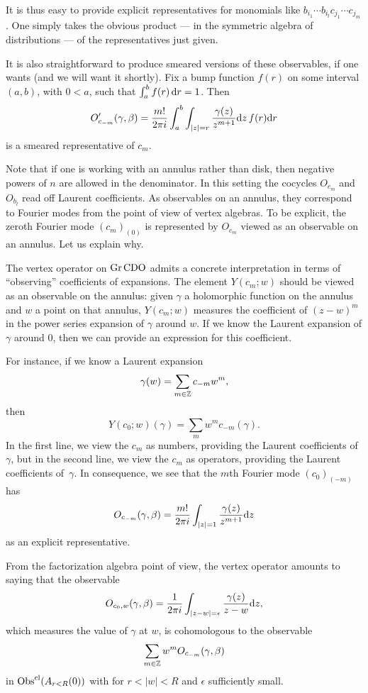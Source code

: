 It is thus easy to provide explicit representatives for monomials like $b_{i_1} \cdots b_{i_l} c_{j_1} \cdots c_{j_m}$.
One simply takes the obvious product --- in the symmetric algebra of distributions --- of the representatives just given.

It is also straightforward to produce smeared versions of these observables, if one wants 
(and we will want it shortly).
Fix a bump function $f(r)$ on some interval $(a,b)$, with $0 < a$, 
such that $\int_a^b f(r) \, {\rm d} r = 1$.
Then
\[
O'_{c_{-m}}(\gamma,\beta) = \frac{m!}{2 \pi i}\int_a^b \int_{|z| = r} \frac{\gamma(z)}{z^{m+1}} {\rm d} z \, f(r) {\rm d} r
\]
is a smeared representative of $c_m$.

Note that if one is working with an annulus rather than disk, then negative powers of $n$ are allowed in the denominator.
In this setting the cocycles $O_{c_m}$ and $O_{b_l}$ read off Laurent coefficients.
As observables on an annulus, they correspond to Fourier modes from the point of view of vertex algebras.
To be explicit, the zeroth Fourier mode $(c_m)_{(0)}$ is represented by $O_{c_m}$ viewed as an observable on an annulus.
Let us explain why.

The vertex operator on ${\rm Gr}\,{\rm CDO}$ admits a concrete interpretation in terms of ``observing'' coefficients of expansions.
The element $Y(c_m;w)$ should be viewed as an observable on the annulus:
given $\gamma$ a holomorphic function on the annulus and $w$ a point on that annulus, 
$Y(c_m;w)$ measures the coefficient of $(z-w)^m$ in the power series expansion of $\gamma$ around $w$.
If we know the Laurent expansion of $\gamma$ around $0$, then we can provide an expression for this coefficient.

For instance, if we know a Laurent expansion
\[
\gamma(w) = \sum_{m \in \mathbb Z} c_{-m} w^m,
\]
then
\[
Y(c_0;w)(\gamma) = \sum_m w^m c_{-m}(\gamma).
\]
In the first line, we view the $c_m$ as numbers, providing the Laurent coefficients of $\gamma$,
but in the second line, we view the $c_m$ as operators, providing the Laurent coefficients of~$\gamma$.
In consequence, we see that the $m$th Fourier mode $(c_0)_{(-m)}$ has 
\[
O_{c_{-m}}(\gamma,\beta) = \frac{m!}{2 \pi i} \int_{|z| = 1} \frac{\gamma(z)}{z^{m+1}} {\rm d} z
\]
as an explicit representative.

From the factorization algebra point of view, 
the vertex operator amounts to saying that the observable
\[
O_{c_0,w}(\gamma,\beta) = \frac{1}{2 \pi i} \int_{|z-w| = \epsilon} \frac{\gamma(z)}{z-w} {\rm d} z,
\]
which measures the value of $\gamma$ at $w$, is cohomologous to the observable
\[
\sum_{m \in \mathbb Z} w^m O_{c_{-m}}(\gamma,\beta)
\]
in ${\rm Obs}^{{\rm cl}}(A_{r<R}(0))$ with for $r < |w| < R$ and $\epsilon$ sufficiently small. 

